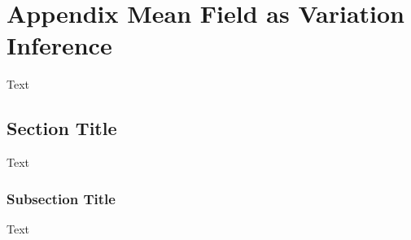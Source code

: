 \chapter{Appendix Mean Field as Variation Inference}\label{appA}
Text

\section{Section Title}  %
Text

\subsection{Subsection Title} %
Text 
